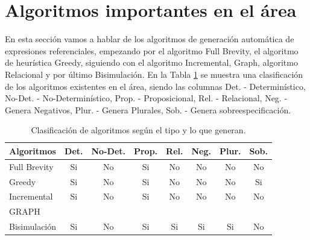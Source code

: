 \section{Algoritmos importantes en el \'area}
\label{sec:algoritmos_area}


En esta secci\'on vamos a hablar de los algoritmos de generaci\'on autom\'atica de expresiones referenciales, empezando por el algoritmo Full Brevity, el algoritmo de heur\'istica Greedy, siguiendo con el algoritmo Incremental, Graph, algoritmo Relacional y por \'ultimo Bisimulaci\'on. En la Tabla \ref{clasificacion_algoritmos} se muestra una clasificaci\'on de los algoritmos existentes en el \'area, siendo las columnas Det. - Determin\'istico, No-Det. - No-Determin\'istico, Prop. - Proposicional, Rel. - Relacional, Neg. - Genera Negativos, Plur. - Genera Plurales, Sob. - Genera sobreespecificaci\'on. 


\begin{table}[h!]
\begin{center}
\begin{tabular}{|l|c|c|c|c|c|c|c|}
\hline
 Algoritmos& Det. & No-Det. & Prop. & Rel. & Neg. & Plur. & Sob. \\
\hline
Full Brevity &Si & No&Si&No&No&No& No \\
Greedy&Si & No&Si&No&No&No& Si \\
Incremental&Si & No&Si&No&No&No& No \\
GRAPH&&&&&&& \\
Bisimulaci\'on&Si & No&Si&Si&Si&Si& No \\ \hline

\end{tabular}
\caption{Clasificaci\'on de algoritmos seg\'un el tipo y lo que generan.} 
\label{clasificacion_algoritmos}
\vspace*{-.5cm}
\end{center}
\end{table}


 


